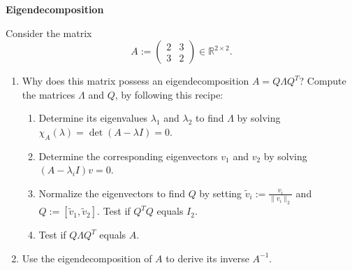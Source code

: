 \textbf{Eigendecomposition}

Consider the matrix $$A:=\begin{pmatrix}2&3\\3&2 \end{pmatrix} \in \mathbb{R}^{2\times 2}. $$
\begin{enumerate}
	\item Why does this matrix possess an eigendecomposition $A= Q \Lambda Q^T$? Compute the matrices $\Lambda$ and $Q$, by following this recipe:
\begin{enumerate}
\item Determine its eigenvalues $\lambda_1$ and $\lambda_2$ to find $\Lambda$ by solving $\chi_A(\lambda) = \det(A-\lambda I) = 0$.
\item Determine the corresponding eigenvectors $v_1$ and $v_2$ by solving $  (A-\lambda_i I )v = 0$.
\item Normalize the eigenvectors to find $Q$ by setting $\tilde{v}_i := \frac{v_i}{\|v_i\|_2}$ and $Q := [\tilde{v}_1,\tilde{v}_2]$. Test if $Q^TQ$ equals $I_2$.
\item Test if $Q \Lambda Q^T$ equals $A$.
\end{enumerate}
\item Use the eigendecomposition of $A$ to derive its inverse $A^{-1}$.
\end{enumerate}
